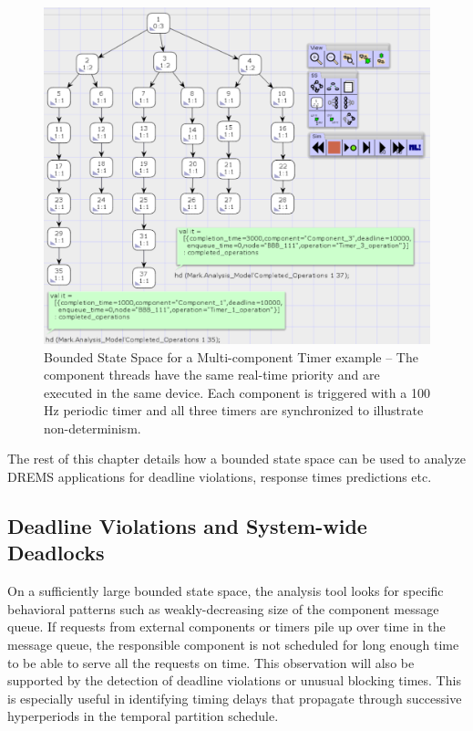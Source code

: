 \begin{figure}[htb]
	\centering
	\includegraphics[width=\textwidth]{./img/state-space-analysis.png}
	\caption{Bounded State Space for a Multi-component Timer example -- The component threads have the same real-time priority and are executed in the same device. Each component is triggered with a 100 Hz periodic timer and all three timers are synchronized to illustrate non-determinism.}
	\label{fig:SSScreenshot}
\end{figure}
\FloatBarrier

The rest of this chapter details how a bounded state space can be used to analyze DREMS applications for deadline violations, response times predictions etc. 

\subsection{Deadline Violations and System-wide Deadlocks}




On a sufficiently large bounded state space, the analysis tool looks for specific behavioral patterns such as weakly-decreasing size of the component message queue. If requests from external components or timers pile up over time in the message queue, the responsible component is not scheduled for long enough time to be able to serve all the requests on time. This observation will also be supported by the detection of deadline violations or unusual blocking times. This is especially useful in identifying timing delays that propagate through successive hyperperiods in the temporal partition schedule. 

